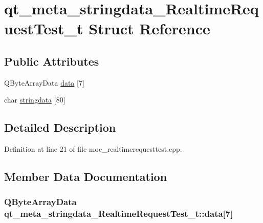 \hypertarget{structqt__meta__stringdata___realtime_request_test__t}{}\section{qt\+\_\+meta\+\_\+stringdata\+\_\+\+Realtime\+Request\+Test\+\_\+t Struct Reference}
\label{structqt__meta__stringdata___realtime_request_test__t}
\subsection*{Public Attributes}
\begin{DoxyCompactItemize}
\item 
Q\+Byte\+Array\+Data \hyperlink{structqt__meta__stringdata___realtime_request_test__t_a42fa30f4044c343b276344d660113b36}{data} \mbox{[}7\mbox{]}
\item 
char \hyperlink{structqt__meta__stringdata___realtime_request_test__t_a75f77696c722584a4fc1f4b589a7be05}{stringdata} \mbox{[}80\mbox{]}
\end{DoxyCompactItemize}


\subsection{Detailed Description}


Definition at line 21 of file moc\+\_\+realtimerequesttest.\+cpp.



\subsection{Member Data Documentation}
\hypertarget{structqt__meta__stringdata___realtime_request_test__t_a42fa30f4044c343b276344d660113b36}{}
\subsubsection[{data}]{\setlength{\rightskip}{0pt plus 5cm}Q\+Byte\+Array\+Data qt\+\_\+meta\+\_\+stringdata\+\_\+\+Realtime\+Request\+Test\+\_\+t\+::data\mbox{[}7\mbox{]}}\label{structqt__meta__stringdata___realtime_request_test__t_a42fa30f4044c343b276344d660113b36}


